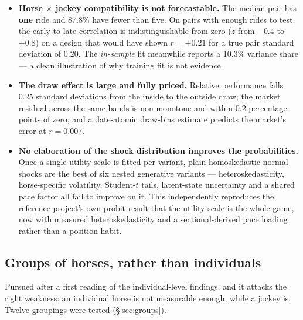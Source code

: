 \documentclass[11pt,a4paper]{article}
\newcommand{\bad}[1]{\textcolor{warm}{\textbf{#1}}}
\begin{document}
\begin{itemize}\itemsep2pt
\item \textbf{Horse $\times$ jockey compatibility is not forecastable.} The median
pair has \bad{one} ride and 87.8\% have fewer than five. On pairs with enough
rides to test, the early-to-late correlation is indistinguishable from zero
($z$ from $-0.4$ to $+0.8$) on a design that would have shown $r=+0.21$ for a true
pair standard deviation of 0.20. The \emph{in-sample} fit meanwhile reports a
10.3\% variance share --- a clean illustration of why training fit is not evidence.

\item \textbf{The draw effect is large and fully priced.} Relative performance
falls 0.25 standard deviations from the inside to the outside draw; the market
residual across the same bands is non-monotone and within 0.2 percentage points of
zero, and a date-atomic draw-bias estimate predicts the market's error at
$r=0.007$.

\item \textbf{No elaboration of the shock distribution improves the
probabilities.} Once a single utility scale is fitted per variant, plain
homoskedastic normal shocks are the best of six nested generative variants ---
heteroskedasticity, horse-specific volatility, Student-$t$ tails, latent-state
uncertainty and a shared pace factor all fail to improve on it. This
independently reproduces the reference project's own probit result that the
utility scale is the whole game, now with measured heteroskedasticity and a
sectional-derived pace loading rather than a position habit.
\end{itemize}

\subsection*{Groups of horses, rather than individuals}

Pursued after a first reading of the individual-level findings, and it attacks the
right weakness: an individual horse is not measurable enough, while a jockey is.
Twelve groupings were tested (\S\ref{sec:groups}).
\end{document}
